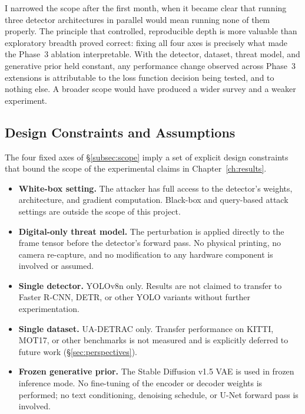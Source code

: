 \documentclass[12pt,a4paper]{report}
\begin{document}
I narrowed the scope after the first month, when it became clear
that running three detector architectures in parallel would mean
running none of them properly. The principle that controlled,
reproducible depth is more valuable than exploratory breadth
proved correct: fixing all four axes is precisely what made the
Phase~3 ablation interpretable. With the detector, dataset,
threat model, and generative prior held constant, any performance
change observed across Phase~3 extensions is attributable to the
loss function decision being tested, and to nothing else. A
broader scope would have produced a wider survey and a weaker
experiment.

\subsection{Design Constraints and Assumptions}
\label{subsec:constraints}

The four fixed axes of \S\ref{subsec:scope} imply a set of
explicit design constraints that bound the scope of the
experimental claims in Chapter~\ref{ch:results}.

\begin{itemize}[itemsep=5pt]
  \item \textbf{White-box setting.} The attacker has full
    access to the detector's weights, architecture, and
    gradient computation. Black-box and query-based attack
    settings are outside the scope of this project.

  \item \textbf{Digital-only threat model.} The perturbation
    is applied directly to the frame tensor before the
    detector's forward pass. No physical printing, no
    camera re-capture, and no modification to any hardware
    component is involved or assumed.

  \item \textbf{Single detector.} YOLOv8n only. Results are
    not claimed to transfer to Faster R-CNN, DETR, or other
    YOLO variants without further experimentation.

  \item \textbf{Single dataset.} UA-DETRAC only. Transfer
    performance on KITTI, MOT17, or other benchmarks is not
    measured and is explicitly deferred to future work
    (\S\ref{sec:perspectives}).

  \item \textbf{Frozen generative prior.} The Stable
    Diffusion v1.5 VAE is used in frozen inference mode.
    No fine-tuning of the encoder or decoder weights is
    performed; no text conditioning, denoising schedule,
    or U-Net forward pass is involved.
\end{itemize}
\end{document}

